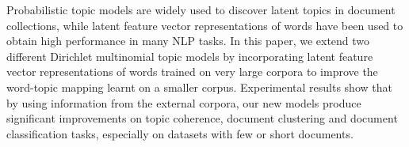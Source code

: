 Probabilistic topic models are widely used to discover latent topics in document collections, while latent feature vector representations of words have been used to obtain high performance in many NLP tasks. In this paper, we extend two different Dirichlet multinomial topic models by incorporating latent feature vector representations of words trained on very large corpora to improve the word-topic mapping learnt on a smaller corpus. Experimental results show that by using information from the external corpora, our new models produce significant improvements on topic coherence, document clustering and document classification tasks, especially on datasets with few or short documents.
